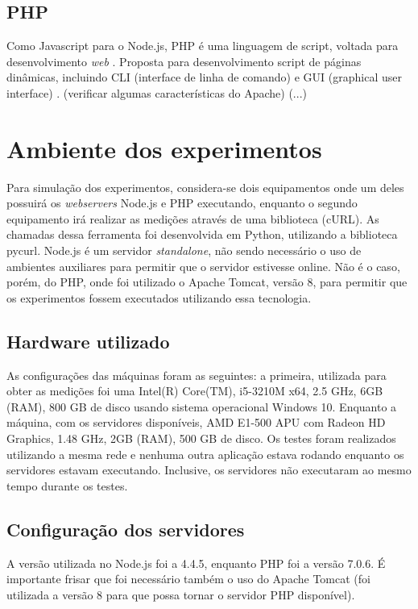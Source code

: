 \documentclass[conference,compsoc]{IEEEtran}
\begin{document}
\subsection{PHP}
Como Javascript para o Node.js, PHP é uma linguagem de script, voltada para desenvolvimento \textit{web} \cite{php_oficial}. Proposta para desenvolvimento script de páginas dinâmicas, incluindo CLI (interface de linha de comando) e GUI (graphical user interface)\cite{performance_comparison} \cite{performance_comparison}. (verificar algumas características do Apache) (...)

\section{Ambiente dos experimentos}
Para simulação dos experimentos, considera-se dois equipamentos onde um deles possuirá os \textit{webservers} Node.js e PHP executando, enquanto o segundo equipamento irá realizar as medições através de uma biblioteca (cURL). As chamadas dessa ferramenta foi desenvolvida em Python, utilizando a biblioteca pycurl. Node.js é um servidor \textit{standalone}, não sendo necessário o uso de ambientes auxiliares para permitir que o servidor estivesse online. Não é o caso, porém, do PHP, onde foi utilizado o Apache Tomcat, versão 8, para permitir que os experimentos fossem executados utilizando essa tecnologia.

\subsection{Hardware utilizado}
As configurações das máquinas foram as seguintes: a primeira, utilizada para obter as medições foi uma Intel(R) Core(TM), i5-3210M x64, 2.5 GHz, 6GB (RAM), 800 GB de disco usando sistema operacional Windows 10. Enquanto a máquina, com os servidores disponíveis, AMD E1-500 APU com Radeon HD Graphics, 1.48 GHz, 2GB (RAM), 500 GB de disco. Os testes foram realizados utilizando a mesma rede e nenhuma outra aplicação estava rodando enquanto os servidores estavam executando. Inclusive, os servidores não executaram ao mesmo tempo durante os testes. 

\subsection{Configuração dos servidores}
A versão utilizada no Node.js foi a 4.4.5, enquanto PHP foi a versão 7.0.6. É importante frisar que foi necessário também o uso do Apache Tomcat (foi utilizada a versão 8 para que possa tornar o servidor PHP disponível). 
\end{document}
